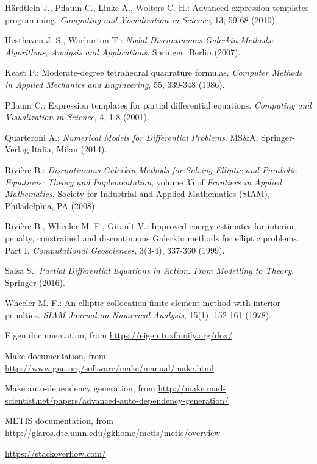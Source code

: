 \documentclass[12pt, a4paper]{article}
\theoremstyle{definition}
\theoremstyle{plain}
\theoremstyle{plain}
\theoremstyle{definition}
\begin{document}
\begin{thebibliography}{99}
	H\"ardtlein J., Pflaum C., Linke A., Wolters C. H.: Advanced expression templates
	programming. \emph{Computing and Visualization in Science}, 13, 59-68 (2010).
	
	Hesthaven J. S., Warburton T.: \emph{Nodal Discontinuous Galerkin Methods: 
	Algorithms, Analysis and Applications}. Springer, Berlin (2007).
	
	Keast P.: Moderate-degree tetrahedral quadrature formulas. \emph{Computer 
	Methods in Applied Mechanics and Engineering}, 55, 339-348 (1986).

	Pflaum C.: Expression templates for partial differential equations. \emph{Computing and Visualization in Science}, 4, 1-8 (2001).
	
	Quarteroni A.: \emph{Numerical Models for Differential Problems}. MS\&A, 
	Springer-Verlag Italia, Milan (2014).
	
	Rivière B.: \emph{Discontinuous Galerkin Methods for Solving Elliptic and 
	Parabolic Equations: Theory and Implementation}, volume 35 of 
	\emph{Frontiers in Applied Mathematics}. Society for Industrial and Applied 
	Mathematics (SIAM), Philadelphia, PA (2008).
	
	Rivière B., Wheeler M. F., Girault V.: Improved energy estimates for 
	interior penalty, constrained and discontinuous Galerkin methods for 
	elliptic problems. Part I. \emph{Computational Geosciences}, 3(3-4), 
	337-360 (1999).
	
	Salsa S.: \emph{Partial Differential Equations in Action: From Modelling to 
	Theory}. Springer (2016).

	Wheeler M. F.: An elliptic collocation-finite element method with interior 
	penalties. \emph{SIAM Journal on Numerical Analysis}, 15(1), 152-161 (1978).
	
	Eigen documentation, from {\footnotesize \url{https://eigen.tuxfamily.org/dox/}}
	
	Make documentation, from {\footnotesize \url{http://www.gnu.org/software/make/manual/make.html}}
	
	Make auto-dependency generation, from {\footnotesize \url{http://make.mad-scientist.net/papers/advanced-auto-dependency-generation/}}
	
	METIS documentation, from {\footnotesize \url{http://glaros.dtc.umn.edu/gkhome/metis/metis/overview}}
	
	{\footnotesize \url{https://stackoverflow.com/}}
	
\end{thebibliography}
\end{document}
